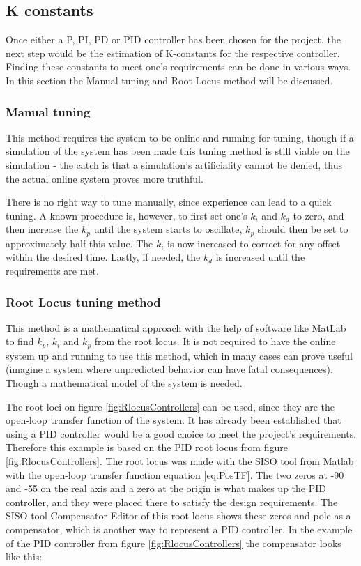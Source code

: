 \subsection{K constants}

Once either a P, PI, PD or PID controller has been chosen for the project, the next step would be the estimation of K-constants for the respective controller. Finding these constants to meet one's requirements can be done in various ways. In this section the Manual tuning and Root Locus method will be discussed.


\subsubsection{Manual tuning}

This method requires the system to be online and running for tuning, though if a simulation of the system has been made this tuning method is still viable on the simulation - the catch is that a simulation’s artificiality cannot be denied, thus the actual online system proves more truthful.\par

There is no right way to tune manually, since experience can lead to a quick tuning. A known procedure is, however, to first set one’s $k_i$ and $k_d$ to zero, and then increase the $k_p$ until the system starts to oscillate, $k_p$ should then be set to approximately half this value. The $k_i$ is now increased to correct for any offset within the desired time. Lastly, if needed, the $k_d$ is increased until the requirements are met.


\subsubsection{Root Locus tuning method}

This method is a mathematical approach with the help of software like MatLab to find $k_p$, $k_i$ and $k_p$ from the root locus. It is not required to have the online system up and running to use this method, which in many cases can prove useful (imagine a system where unpredicted behavior can have fatal consequences). Though a mathematical model of the system is needed.\par

The root loci on figure \ref{fig:RlocusControllers} can be used, since they are the open-loop transfer function of the system. It has already been established that using a PID controller would be a good choice to meet the project’s requirements. Therefore this example is based on the PID root locus from figure \ref{fig:RlocusControllers}. The root locus was made with the SISO tool from Matlab with the open-loop transfer function equation \ref{eq:PosTF}. The two zeros at -90 and -55 on the real axis and a zero at the origin is what makes up the PID controller, and they were placed there to satisfy the design requirements. The SISO tool Compensator Editor of this root locus shows these zeros and pole as a compensator, which is another way to represent a PID controller. In the example of the PID controller from figure \ref{fig:RlocusControllers}  the compensator looks like this:\\ 

